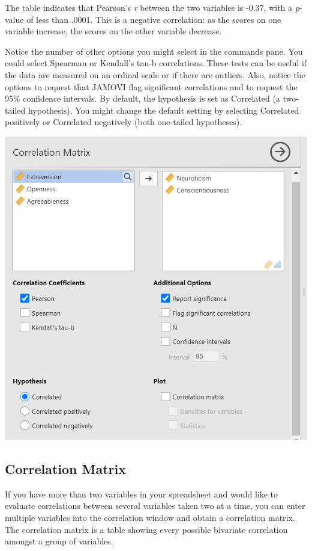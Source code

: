 \documentclass[
]{book}
\begin{document}
The table indicates that Pearson's \emph{r} between the two variables is -0.37, with a \emph{p}-value of less than .0001. This is a negative correlation: as the scores on one variable increase, the scores on the other variable decrease.

Notice the number of other options you might select in the commands pane. You could select { Spearman} or {Kendall's tau-b} correlations. These tests can be useful if the data are measured on an ordinal scale or if there are outliers. Also, notice the options to request that JAMOVI {flag significant correlations} and to request the 95\% confidence intervals. By default, the hypothesis is set as {Correlated} (a two-tailed hypothesis). You might change the default setting by selecting {Correlated positively} or {Correlated negatively} (both one-tailed hypotheses).

\includegraphics{img/Correlation_ExtraCommands.png}

\hypertarget{correlation-matrix-2}{%
\subsection{Correlation Matrix}\label{correlation-matrix-2}}

If you have more than two variables in your spreadsheet and would like to evaluate correlations between several variables taken two at a time, you can enter multiple variables into the correlation window and obtain a correlation matrix. The correlation matrix is a table showing every possible bivariate correlation amongst a group of variables.
\end{document}

